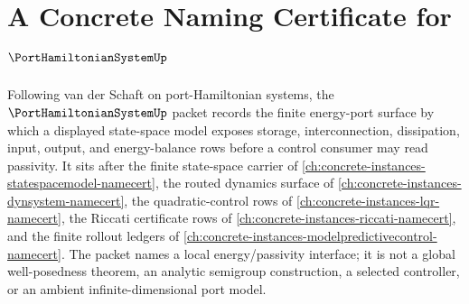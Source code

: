 \chapter{A Concrete Naming Certificate for $\PortHamiltonianSystemUp$}
\label{ch:concrete-instances-port-hamiltonian-system-namecert}

Following van der Schaft on port-Hamiltonian systems, the $\PortHamiltonianSystemUp$ packet records the finite energy-port surface by which a displayed state-space model exposes storage, interconnection, dissipation, input, output, and energy-balance rows before a control consumer may read passivity. It sits after the finite state-space carrier of \autoref{ch:concrete-instances-statespacemodel-namecert}, the routed dynamics surface of \autoref{ch:concrete-instances-dynsystem-namecert}, the quadratic-control rows of \autoref{ch:concrete-instances-lqr-namecert}, the Riccati certificate rows of \autoref{ch:concrete-instances-riccati-namecert}, and the finite rollout ledgers of \autoref{ch:concrete-instances-modelpredictivecontrol-namecert}. The packet names a local energy/passivity interface; it is not a global well-posedness theorem, an analytic semigroup construction, a selected controller, or an ambient infinite-dimensional port model.

